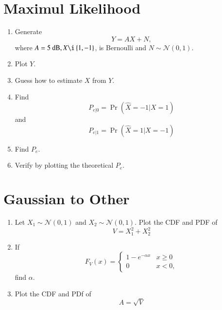 \documentclass[journal,12pt,twocolumn]{IEEEtran}
\renewcommand\thesection{\arabic{section}}
\providecommand{\pr}[1]{\ensuremath{\Pr\left(#1\right)}}
\providecommand{\cbrak}[1]{\ensuremath{\left\{#1\right\}}}
\theoremstyle{remark}
\providecommand{\gauss}[2]{\mathcal{N}\ensuremath{\left(#1,#2\right)}}
\numberwithin{equation}{section}
\begin{document}
\section{Maximul Likelihood}
\begin{enumerate}[label=\thesection.\arabic*
,ref=\thesection.\theenumi]
\item Generate 
\begin{equation}
Y = AX+N,
\end{equation}
		where $A = 5 \text{ dB}, X \i \cbrak{1,-1}$,  is Bernoulli and $N \sim \gauss{0}{1}$.
	\item Plot $Y$.
	\item Guess how to estimate $X$ from $Y$.
\item
\label{ml-ch4_sim}
Find 
\begin{equation}
	P_{e|0} = \pr{\hat{X} = -1|X=1}
\end{equation}
and 
\begin{equation}
	P_{e|1} = \pr{\hat{X} = 1|X=-1}
\end{equation}
%
\item Find $P_e$.
%
\item
Verify by plotting  the theoretical $P_e$.  
		\end{enumerate}
\section{Gaussian to Other}
\begin{enumerate}[label=\thesection.\arabic*
,ref=\thesection.\theenumi]
\item
Let $X_1 \sim  \gauss{0}{1}$ and $X_2 \sim  \gauss{0}{1}$. Plot the CDF and PDF of
%
\begin{equation}
V = X_1^2 + X_2^2
\end{equation}
%
%
%
\item
If
%
\begin{equation}
F_{V}(x) = 
\begin{cases}
1 - e^{-\alpha x} & x \geq 0 \\
0 & x < 0,
\end{cases}
\end{equation}
%
find $\alpha$.
%
\item
\label{ch3_raleigh_sim}
Plot the CDF and PDf of
%
\begin{equation}
A = \sqrt{V}
\end{equation}
%
\end{enumerate}
\end{document}
